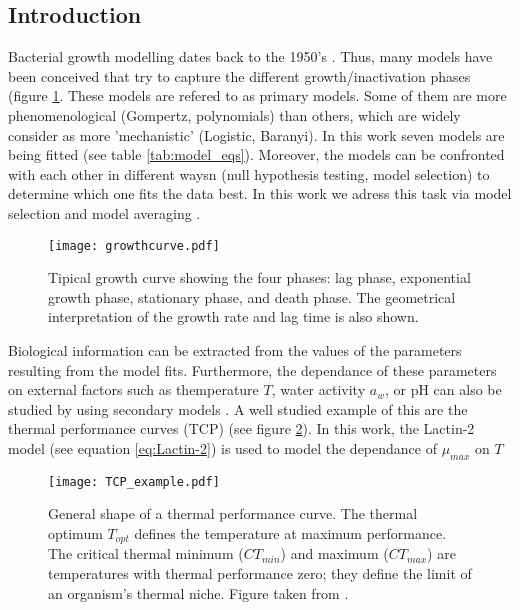 \documentclass[titlepage,11pt]{article}
\begin{document}
	\begin{linenumbers}
		\section{Introduction}\label{sec:introduction}
		Bacterial growth modelling dates back to the 1950's \cite{Schaechter2015}. Thus, many models have been conceived that try to capture the different growth/inactivation phases (figure \ref{fig:growthcurve}. These models are refered to as primary models. Some of them are more phenomenological (Gompertz, polynomials) than others, which are widely consider as more 'mechanistic' (Logistic, Baranyi). In this work seven models are being fitted (see table \ref{tab:model_eqs}). Moreover, the models can be confronted with each other in different waysn (null hypothesis testing, model selection) to determine which one fits the data best. In this work we adress this task via model selection and model averaging \cite{Anderson2002, Johnson2004}. \\
		
		\begin{figure}[h]
			\centering
			\texttt{[image: growthcurve.pdf]}
			\caption{Tipical growth curve showing the four phases: lag phase, exponential growth phase, stationary phase, and death phase. The geometrical interpretation of the growth rate and lag time is also shown.}
			\label{fig:growthcurve}
		\end{figure}
		Biological information can be extracted from the values of the parameters resulting from the model fits. Furthermore, the dependance of these parameters on external factors such as themperature $ T $, water activity $ a_w $, or pH can also be studied by using secondary models \cite{Ratkowsky1982, Phillips1987, Stannard1985, DaSilva2018, Zwietering1991, Bernhardt2018, Lactin1995, Valik2013, Logan1976}. A well studied example of this are the thermal performance curves (TCP) (see figure \ref{fig:TCP_example}). In this work, the Lactin-2 model (see equation \ref{eq:Lactin-2}) is used to model the dependance of $ \mu_{max} $ on $ T $
		\begin{figure}[h]
			\centering
			\texttt{[image: TCP\_example.pdf]}
			\caption{General shape of a thermal performance curve. The thermal optimum $ T_{opt} $ defines the temperature at maximum performance. The critical thermal minimum ($ CT_{min} $) and maximum ($ CT_{max} $) are temperatures with thermal performance zero; they define the limit of an organism's thermal niche. Figure taken from \cite{Krenek2011}.}
			\label{fig:TCP_example}
		\end{figure}
		

\end{linenumbers}
\end{document}

